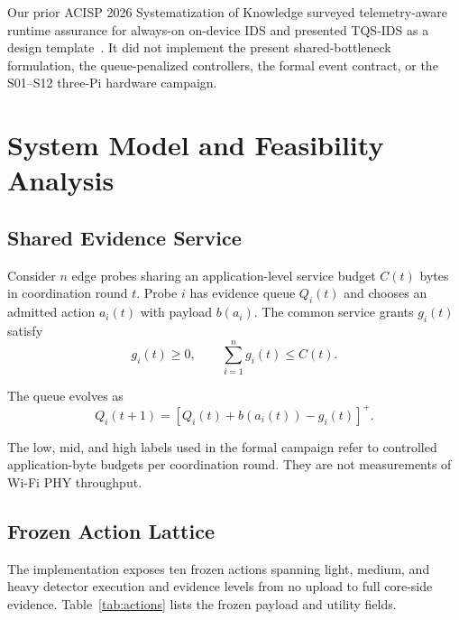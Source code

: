 \documentclass[10pt,journal]{IEEEtran}
\begin{document}
Our prior ACISP 2026 Systematization of Knowledge surveyed telemetry-aware
runtime assurance for always-on on-device IDS and presented TQS-IDS as a
design template~\cite{ouyang2026sok}. It did not implement the present
shared-bottleneck formulation, the queue-penalized controllers, the
formal event contract, or the S01--S12 three-Pi hardware campaign.

\section{System Model and Feasibility Analysis}
\label{sec:model}

\subsection{Shared Evidence Service}

Consider $n$ edge probes sharing an application-level service budget
$C(t)$ bytes in coordination round $t$. Probe $i$ has evidence queue
$Q_i(t)$ and chooses an admitted action $a_i(t)$ with payload $b(a_i)$.
The common service grants $g_i(t)$ satisfy
\begin{equation}
g_i(t)\geq0,
\qquad
\sum_{i=1}^{n}g_i(t)\leq C(t).
\label{eq:cap}
\end{equation}

The queue evolves as
\begin{equation}
Q_i(t+1)
=
\left[
Q_i(t)+b(a_i(t))-g_i(t)
\right]^+ .
\label{eq:queue}
\end{equation}

The low, mid, and high labels used in the formal campaign refer to
controlled application-byte budgets per coordination round. They are
not measurements of Wi-Fi PHY throughput.

\subsection{Frozen Action Lattice}

The implementation exposes ten frozen actions spanning light, medium,
and heavy detector execution and evidence levels from no upload to full
core-side evidence. Table~\ref{tab:actions} lists the frozen payload and
utility fields.
\end{document}
